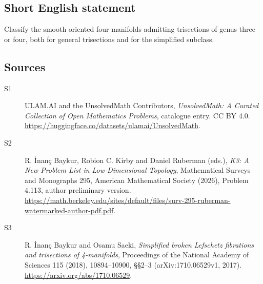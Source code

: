 \documentclass[11pt]{article}
\begin{document}
\subsection{Short English statement}
Classify the smooth oriented four-manifolds admitting trisections of genus three or four, both for general trisections and for the simplified subclass.
\subsection{Sources}
\begin{description}
\item[\hypertarget{source:statement:1}{S1}] ULAM.AI and the UnsolvedMath Contributors, \emph{UnsolvedMath: A Curated Collection of Open Mathematics Problems}, catalogue entry. CC BY 4.0. \url{https://huggingface.co/datasets/ulamai/UnsolvedMath}.
\item[\hypertarget{source:statement:2}{S2}] R. İnanç Baykur, Robion C. Kirby and Daniel Ruberman (eds.), \emph{K3: A New Problem List in Low-Dimensional Topology}, Mathematical Surveys and Monographs 295, American Mathematical Society (2026), Problem 4.113, author preliminary version. \url{https://math.berkeley.edu/sites/default/files/surv-295-ruberman-watermarked-author-pdf.pdf}.
\item[\hypertarget{source:statement:3}{S3}] R. İnanç Baykur and Osamu Saeki, \emph{Simplified broken Lefschetz fibrations and trisections of 4-manifolds}, Proceedings of the National Academy of Sciences 115 (2018), 10894--10900, §§2--3 (arXiv:1710.06529v1, 2017). \url{https://arxiv.org/abs/1710.06529}.
\end{description}
\label{end:statement}
\end{document}
